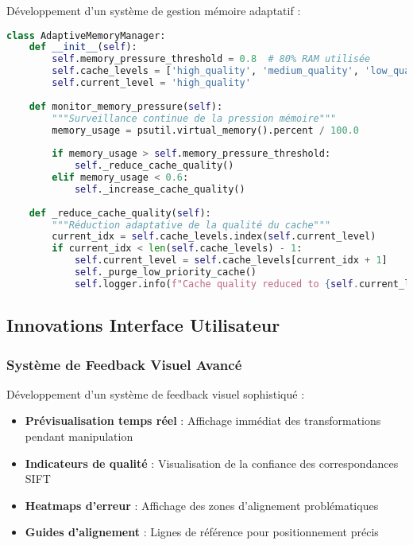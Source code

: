 \documentclass[12pt,a4paper]{report}
\begin{document}
Développement d'un système de gestion mémoire adaptatif :

\begin{lstlisting}[language=Python]
class AdaptiveMemoryManager:
    def __init__(self):
        self.memory_pressure_threshold = 0.8  # 80% RAM utilisée
        self.cache_levels = ['high_quality', 'medium_quality', 'low_quality']
        self.current_level = 'high_quality'
    
    def monitor_memory_pressure(self):
        """Surveillance continue de la pression mémoire"""
        memory_usage = psutil.virtual_memory().percent / 100.0
        
        if memory_usage > self.memory_pressure_threshold:
            self._reduce_cache_quality()
        elif memory_usage < 0.6:
            self._increase_cache_quality()
    
    def _reduce_cache_quality(self):
        """Réduction adaptative de la qualité du cache"""
        current_idx = self.cache_levels.index(self.current_level)
        if current_idx < len(self.cache_levels) - 1:
            self.current_level = self.cache_levels[current_idx + 1]
            self._purge_low_priority_cache()
            self.logger.info(f"Cache quality reduced to {self.current_level}")
\end{lstlisting}

\subsection{Innovations Interface Utilisateur}

\subsubsection{Système de Feedback Visuel Avancé}

Développement d'un système de feedback visuel sophistiqué :

\begin{itemize}
\item \textbf{Prévisualisation temps réel} : Affichage immédiat des transformations pendant manipulation
\item \textbf{Indicateurs de qualité} : Visualisation de la confiance des correspondances SIFT
\item \textbf{Heatmaps d'erreur} : Affichage des zones d'alignement problématiques
\item \textbf{Guides d'alignement} : Lignes de référence pour positionnement précis
\end{itemize}
\end{document}
